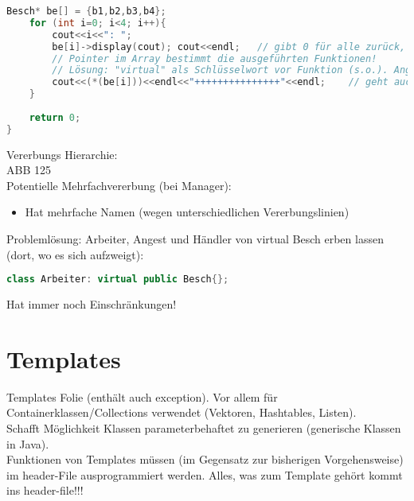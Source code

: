 \begin{lstlisting}[language=C++]
	Besch* be[] = {b1,b2,b3,b4};
	for (int i=0; i<4; i++){
		cout<<i<<": "; 
		be[i]->display(cout); cout<<endl;	// gibt 0 für alle zurück, da nur calc() (und display()) vom Typ Besch ausgeführt, da das Array aus Besch besteht! Die Funktion calc() wurde überschrieben (Vgl. Überladen, wenn bei gleichen Namen verschiedene Paramater angegeben sind)!
		// Pointer im Array bestimmt die ausgeführten Funktionen!
		// Lösung: "virtual" als Schlüsselwort vor Funktion (s.o.). Angeben bei erstem Auftauchen in Vererbungshierarchie
		cout<<(*(be[i]))<<endl<<"+++++++++++++++"<<endl;	// geht auch, da im Operator (die ja nicht virtuell gemacht werden kann, weil sie kein Member ist) die virtuelle display-Fkt aufgerufen wird.
	}	
	
	return 0;
}
\end{lstlisting}
Vererbungs Hierarchie:\\
ABB 125\\
Potentielle Mehrfachvererbung (bei Manager):
\begin{itemize}
\item Hat mehrfache Namen (wegen unterschiedlichen Vererbungslinien)
\end{itemize}
Problemlösung: Arbeiter, Angest und Händler von virtual Besch erben lassen (dort, wo es sich aufzweigt):
\begin{lstlisting}[language=C++]
class Arbeiter: virtual public Besch{};
\end{lstlisting}
Hat immer noch Einschränkungen!

\section{Templates}
Templates Folie (enthält auch exception).
Vor allem für Containerklassen/Collections verwendet (Vektoren, Hashtables, Listen).\\
Schafft Möglichkeit Klassen parameterbehaftet zu generieren (generische Klassen in Java).\\
Funktionen von Templates müssen (im Gegensatz zur bisherigen Vorgehensweise) im header-File ausprogrammiert werden. Alles, was zum Template gehört kommt ins header-file!!!
